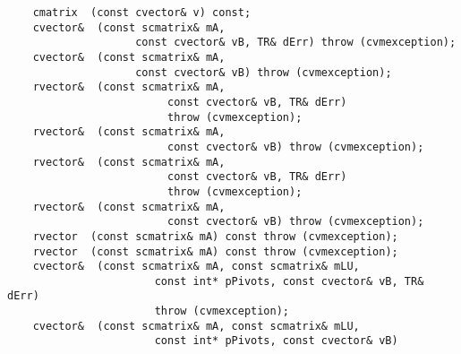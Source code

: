 \verb"    cmatrix "\verb" (const cvector& v) const;"\\
\verb"    cvector& "\verb" (const scmatrix& mA,"\\
\verb"                    const cvector& vB, TR& dErr) throw (cvmexception);"\\
\verb"    cvector& "\verb" (const scmatrix& mA,"\\
\verb"                    const cvector& vB) throw (cvmexception);"\\
\verb"    rvector& "\verb" (const scmatrix& mA,"\\
\verb"                         const cvector& vB, TR& dErr)"\\
\verb"                         throw (cvmexception);"\\
\verb"    rvector& "\verb" (const scmatrix& mA,"\\
\verb"                         const cvector& vB) throw (cvmexception);"\\
\verb"    rvector& "\verb" (const scmatrix& mA,"\\
\verb"                         const cvector& vB, TR& dErr)"\\
\verb"                         throw (cvmexception);"\\
\verb"    rvector& "\verb" (const scmatrix& mA,"\\
\verb"                         const cvector& vB) throw (cvmexception);"\\
\verb"    rvector "\verb" (const scmatrix& mA) const throw (cvmexception);"\\
\verb"    rvector "\verb" (const scmatrix& mA) const throw (cvmexception);"\\
\verb"    cvector& "\verb" (const scmatrix& mA, const scmatrix& mLU,"\\
\verb"                       const int* pPivots, const cvector& vB, TR& dErr)"\\
\verb"                       throw (cvmexception);"\\
\verb"    cvector& "\verb" (const scmatrix& mA, const scmatrix& mLU,"\\
\verb"                       const int* pPivots, const cvector& vB)"\\
